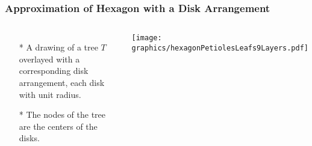 \documentclass{beamer}
\begin{document}
\begin{frame} \frametitle{Approximation of Hexagon with a Disk Arrangement}
    \begin{columns}[c]
        \begin{itemize}
            \item[*] A drawing of a tree $T$ overlayed with a corresponding disk arrangement, each disk with unit radius.
            \item[*] The nodes of the tree are the centers of the disks.
        \end{itemize}
        \begin{minipage}{\linewidth}
            \begin{center}
            \texttt{[image: graphics/hexagonPetiolesLeafs9Layers.pdf]}
            \label{gfx:hexagonPetiolesLeafs9Layers.pdf}
            \end{center}
        \end{minipage}
    \end{columns}
\end{frame}


 
\end{document}
